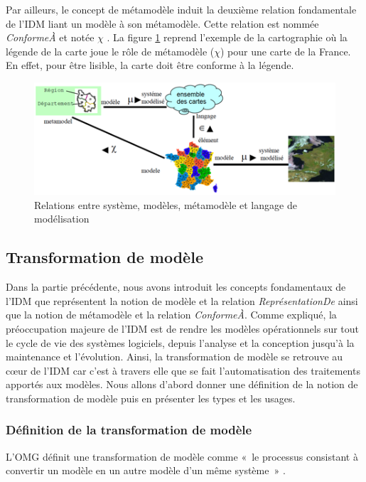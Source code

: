 Par ailleurs, le concept de métamodèle induit la deuxième relation fondamentale 
de l'IDM liant un modèle à son métamodèle. Cette relation est nommée 
\textit{ConformeÀ} et notée $\chi$ \cite{bezivin2004search} 
\cite{favre2004towards}. La figure \ref{fig:carteFavre} reprend l'exemple de la 
cartographie où la légende de la carte joue le rôle de métamodèle ($\chi$) pour 
une carte de la France. En effet, pour être lisible, la carte doit être conforme 
à la légende.

\begin{figure}[!htbp]
 \begin{center}
  \includegraphics[width=1\textwidth]{images/Chapitre1/cartecompleteIDM.png}
 \end{center}
 \caption{Relations entre système, modèles, métamodèle et langage de 
modélisation \protect\cite{favre2006ingenierie}}
 \label{fig:carteFavre}
\end{figure}

\subsection{Transformation de modèle}
Dans la partie précédente, nous avons introduit les concepts fondamentaux de 
l'IDM que représentent la notion de modèle et la relation 
\textit{ReprésentationDe} ainsi que la notion de métamodèle et la relation 
\textit{ConformeÀ}. Comme expliqué, la préoccupation majeure de l'IDM est de 
rendre les modèles opérationnels sur tout le cycle de vie des systèmes 
logiciels, depuis l'analyse et la conception jusqu'à la maintenance et 
l'évolution. Ainsi, la transformation de modèle se retrouve au cœur de l'IDM car 
c'est à travers elle que se fait l'automatisation des traitements apportés aux 
modèles. Nous allons d'abord donner une définition de la notion de 
transformation de modèle puis en présenter les types et les usages.

\subsubsection{Définition de la transformation de modèle}
L'OMG définit une transformation de modèle comme «~le processus consistant à 
convertir un modèle en un autre modèle d'un même système~» \cite{omg2011meta}. 

